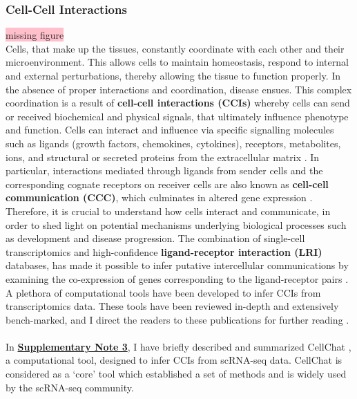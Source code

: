 \subsubsection{Cell-Cell Interactions}
\colorbox{pink}{missing figure}\\
Cells, that make up the tissues, constantly coordinate with each other and their microenvironment. This allows cells to maintain homeostasis, respond to internal and external perturbations, thereby allowing the tissue to function properly. In the absence of proper interactions and coordination, disease ensues. This complex coordination is a result of \textbf{cell-cell interactions (CCIs)} \textbf{\cite{armingol_deciphering_2021}} whereby cells can send or received biochemical and physical signals, that ultimately influence phenotype and function. Cells can interact and influence via specific signalling molecules such as ligands (growth factors, chemokines, cytokines), receptors, metabolites, ions, and structural or secreted proteins from the extracellular matrix \textbf{\cite{armingol_deciphering_2021,armingol_diversification_2024}}. In particular, interactions mediated through ligands from sender cells and the corresponding cognate receptors on receiver cells are also known as \textbf{cell-cell communication (CCC)}, which culminates in altered gene expression \textbf{\cite{armingol_deciphering_2021,armingol_diversification_2024}}. Therefore, it is crucial to understand how cells interact and communicate, in order to shed light on potential mechanisms underlying biological processes such as development and disease progression. The combination of single-cell transcriptomics and high-confidence \textbf{ligand-receptor interaction (LRI)} databases, has made it possible to infer putative intercellular communications by examining the co-expression of genes corresponding to the ligand-receptor pairs \textbf{\cite{wilk_comparative_2023}}. A plethora of computational tools have been developed to infer CCIs from transcriptomics data. These tools have been reviewed in-depth and extensively bench-marked, and I direct the readers to these publications for further reading \textbf{\cite{armingol_deciphering_2021,armingol_diversification_2024,liu_evaluation_2022,xie_comparison_2023,cheng_review_2023}}.\\\\
In \textbf{\hyperref[sec:suppnote3]{Supplementary Note 3}}, I have briefly described and summarized CellChat \textbf{\cite{jin_inference_2021}}, a computational tool, designed to infer CCIs from scRNA-seq data. CellChat is considered as a ‘core’ tool	which established a set of methods and is widely used by the scRNA-seq community. 